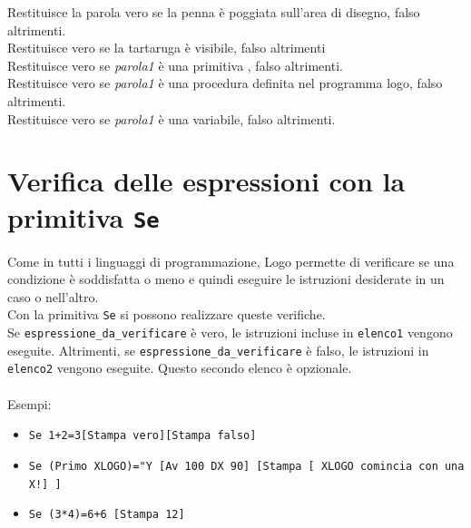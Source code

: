  Restituisce la parola vero se la penna è poggiata sull'area di disegno, falso altrimenti.\\

 Restituisce vero se la tartaruga è visibile, falso altrimenti\\

 Restituisce vero se \textit{parola1} è una primitiva \xlogo, falso altrimenti.\\

 Restituisce vero se \textit{parola1} è una procedura definita nel programma logo, falso altrimenti.\\

 Restituisce vero se \textit{parola1} è una variabile, falso altrimenti.\\



\section{Verifica delle espressioni con la primitiva \texttt{Se}}
Come in tutti i linguaggi di programmazione, Logo permette di verificare se una condizione è soddisfatta o meno e quindi eseguire le istruzioni desiderate in un caso o nell'altro.\\
Con la primitiva \texttt{Se} si possono realizzare queste verifiche.\\
Se \texttt{espressione\_da\_verificare} è vero, le istruzioni incluse in \texttt{elenco1} vengono eseguite. Altrimenti, se \texttt{espressione\_da\_verificare} è falso, le istruzioni in \texttt{elenco2} vengono eseguite. Questo secondo elenco è opzionale.\\ \\
Esempi:

\begin{itemize}
	\item \texttt{Se 1+2=3[Stampa \textquotedbl vero][Stampa \textquotedbl falso]}
	\item \texttt{Se (Primo \textquotedbl XLOGO)="Y  [Av 100 DX 90] [Stampa [ XLOGO comincia con una X!] ]}
	\item \texttt{Se (3*4)=6+6 [Stampa 12]}
\end{itemize}

